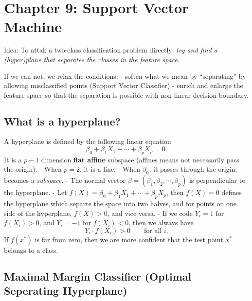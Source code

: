 \documentclass[
  letterpaper,
  DIV=11,
  numbers=noendperiod]{scrreprt}
\begin{document}

\chapter{Chapter 9: Support Vector
Machine}\label{chapter-9-support-vector-machine}

Idea: To attak a two-class classification problem directly: \emph{try
and find a (hyper)plane that separates the classes in the feature space.
}

If we can not, we relax the conditions: - soften what we mean by
``separating'' by allowing misclassified points (Support Vector
Classifier) - enrich and enlarge the feature space so that the
separation is possible with non-linear decision boundary.

\section{What is a hyperplane?}\label{what-is-a-hyperplane}

A hyperplane is defined by the following linear equation \[
\beta_0+ \beta_1X_1 +\cdots +\beta_pX_p=0.
\] It is a \(p-1\) dimension \textbf{flat affine} subspace (affines
means not necessarily pass the origin). - When \(p=2\), it is a line. -
When \(\beta_0\), it passes through the origin, becomes a
\emph{subspace}. - The normal vector
\(\beta=(\beta_1, \beta_2, \cdots, \beta_p)\) is perpendicular to the
hyperplane. - Let \(f(X)= \beta_0+ \beta_1X_1 +\cdots +\beta_pX_p\),
then \(f(X)=0\) defines the hyperplane which separte the space into two
halves, and for points on one side of the hyperplane, \(f(X)>0\), and
vice versa. - If we code \(Y_i=1\) for \(f(X_i)>0\), and \(Y_i=-1\) for
\(f(X_i)<0\), then we always have \[
Y_i\cdot f(X_i)>0 \qquad \text{for all } i.
\] If \(f(x^*)\) is far from zero, then we are more confident that the
test point \(x^*\) belongs to a class.

\section{Maximal Margin Classifier (Optimal Seperating
Hyperplane)}\label{maximal-margin-classifier-optimal-seperating-hyperplane}
\end{document}
